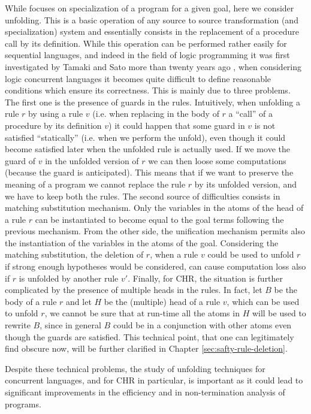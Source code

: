 \documentclass[final]{acmtrans2e}
\begin{document}
While  \cite{Fru04}  focuses on specialization of a program for a
given  goal, here we consider unfolding.  This is a basic
operation of any source to source transformation (and
specialization) system and essentially consists in the replacement
of a procedure call by its definition. While this operation can be
performed rather easily for sequential languages, and indeed  in
the field of logic programming it was first investigated by Tamaki
and Sato more than twenty years ago \cite{TS84}, when considering
logic concurrent languages it becomes quite difficult to define
reasonable conditions which ensure its correctness. This is mainly
due to three problems. The first one is the presence of guards in the rules.
Intuitively, when
unfolding a rule $r$ by using a rule $v$ (i.e. when replacing in
the body of $r$ a ``call'' of a procedure by its definition $v$)
it could happen that some guard in $v$ is not satisfied
``statically'' (i.e. when we perform the unfold), even though it
could become satisfied later when the unfolded rule is actually
used. If we move the guard of $v$ in the unfolded version of $r$
we can then loose some computations (because the guard is
anticipated). This means that if we want to preserve the meaning
of a program we cannot replace the rule $r$ by its unfolded
version, and we have to keep both the rules.
The second source of difficulties consists in matching substitution
mechanism. Only the variables in the atoms of the head of a rule
$r$ can be instantiated to become equal to the goal terms following
the previous mechanism. From the other side, the unification mechanism
permits also the instantiation of the variables in the atoms of the
goal. Considering the matching substitution, the deletion of $r$, when
a rule $v$ could be used to unfold $r$ if strong enough hypotheses
would be considered, can cause computation loss also if $r$ is unfolded
by another rule $v'$. Finally, for CHR, the situation is further complicated by
the presence of multiple heads in the rules.
In fact, let $B$ be the body of a rule $r$ and let $H$ be the (multiple)
head of a rule $v$, which can be used to unfold $r$, we cannot be sure
that at run-time all the atoms in $H$ will be used to rewrite $B$,
since in general $B$ could be in a conjunction with other atoms even
though the guards are satisfied. This technical point, that one can legitimately find
obscure now, will be further clarified in Chapter
\ref{sec:safty-rule-deletion}.

Despite these technical problems, the study of unfolding techniques
for concurrent languages, and for CHR in particular, is important
as it could lead to significant improvements in the efficiency and
in non-termination analysis of programs.
\end{document}
